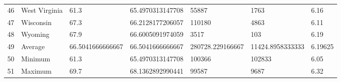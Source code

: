 \begin{table}[ht]
\begin{tabular}{rllllll}
  46 & West Virginia & 61.3 & 65.4970313147708 & 55887 & 1763 & 6.16 \\ 
  47 & Wisconsin & 67.3 & 66.2128177206057 & 110180 & 4863 & 6.11 \\ 
  48 & Wyoming & 67.9 & 66.6005091974059 & 3517 & 103 & 6.19 \\ 
  49 & Average & 66.5041666666667 & 66.5041666666667 & 280728.229166667 & 11424.8958333333 & 6.19625 \\ 
  50 & Minimum & 61.3 & 65.4970313147708 & 100366 & 102833 & 6.05 \\ 
  51 & Maximum & 69.7 & 68.1362892990441 & 99587 & 9687 & 6.32 \\ 
   \hline
\end{tabular}
\end{table}
